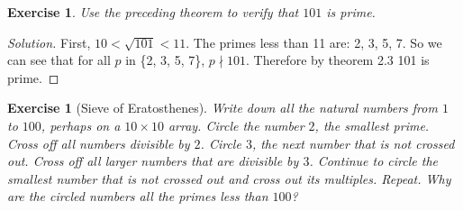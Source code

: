 \documentclass[12pt,leqno]{article}
\numberwithin{equation}{section}
\newtheorem{exer}[thm]{Exercise}
\theoremstyle{definition}
\begin{document}

\begin{exer}
Use the preceding theorem to verify that $101$ is prime.
\end{exer}

\begin{proof}[Solution]
First, $10 < \sqrt{101} < 11$.  The primes less than 11 are: 2, 3, 5, 7.  So we can see that for all $p$ in \{2, 3, 5, 7\}, $p \nmid 101$.  Therefore by theorem 2.3 101 is prime.
\end{proof}



\begin{exer}[Sieve of Eratosthenes]
Write down all the natural numbers from $1$ to $100$, perhaps on a
$10 \times 10$ array. Circle the number $2$, the smallest prime.
Cross off all numbers divisible by $2$.  Circle $3$, the next number
that is not crossed out.  Cross off all larger numbers that are
divisible by $3$. Continue to circle the smallest number that is not
crossed out and cross out its multiples. Repeat.  Why are the
circled numbers all the primes less than $100$?
\end{exer}
\end{document}
